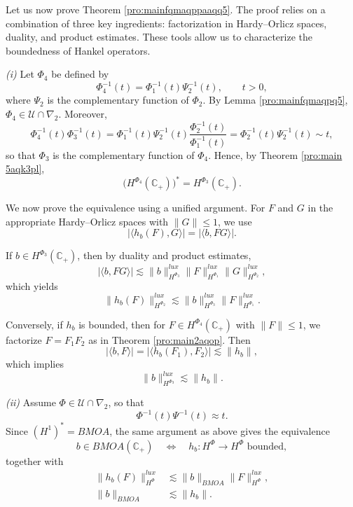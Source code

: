 \documentclass[a4paper,12pt,intlimits,oneside]{amsart}
\theoremstyle{definition}
\numberwithin{equation}{section}
\theoremstyle{definition}
\begin{document}
Let us now prove Theorem \ref{pro:mainfqmaqppaaqq5}.
The proof relies on a combination of three key ingredients: 
factorization in Hardy--Orlicz spaces, duality, and product estimates. 
These tools allow us to characterize the boundedness of Hankel operators.

\medskip

\noindent

\textit{(i)} 
Let $\Phi_{4}$ be defined by
\[
\Phi_{4}^{-1}(t)=\Phi_{1}^{-1}(t)\Psi_{2}^{-1}(t), \qquad t>0,
\]
where $\Psi_{2}$ is the complementary function of $\Phi_{2}$. By Lemma \ref{pro:mainfqmaqpq5}, $\Phi_{4}\in \mathscr{U}\cap\nabla_{2}$. Moreover,
\[
\Phi_{4}^{-1}(t)\Phi_{3}^{-1}(t)
= \Phi_{1}^{-1}(t)\Psi_{2}^{-1}(t)\frac{\Phi_{2}^{-1}(t)}{\Phi_{1}^{-1}(t)}
= \Phi_{2}^{-1}(t)\Psi_{2}^{-1}(t)\sim t,
\]
so that $\Phi_{3}$ is the complementary function of $\Phi_{4}$. Hence, by Theorem \ref{pro:main 5aqk3pl}, 
\[
\big(H^{\Phi_{4}}(\mathbb{C}_{+})\big)^{*}=H^{\Phi_{3}}(\mathbb{C}_{+}).
\]

\smallskip

We now prove the equivalence using a unified argument. For $F$ and $G$ in the appropriate Hardy--Orlicz spaces with $\|G\|\leq 1$, we use
\[
|\langle h_{b}(F),G\rangle|
=|\langle b,FG\rangle|.
\]

If $b\in H^{\Phi_{3}}(\mathbb{C}_{+})$, then by duality and product estimates,
\[
|\langle b,FG\rangle|
\lesssim \|b\|_{H^{\Phi_{3}}}^{lux}
\|F\|_{H^{\Phi_{1}}}^{lux}
\|G\|_{H^{\Psi_{2}}}^{lux},
\]
which yields
\begin{equation}\label{eq:ineitedehay}
\|h_{b}(F)\|_{H^{\Phi_{2}}}^{lux}
\lesssim \|b\|_{H^{\Phi_{3}}}^{lux}
\|F\|_{H^{\Phi_{1}}}^{lux}.
\end{equation}

Conversely, if $h_{b}$ is bounded, then for $F\in H^{\Phi_{4}}(\mathbb{C}_{+})$ with $\|F\|\leq 1$, we factorize $F=F_{1}F_{2}$ as in Theorem \ref{pro:main2aqop}. Then
\[
|\langle b,F\rangle|
=|\langle h_{b}(F_{1}),F_{2}\rangle|
\lesssim \|h_{b}\|,
\]
which implies
\begin{equation}\label{eq:ineitaqedehay}
\|b\|_{H^{\Phi_{3}}}^{lux}\lesssim \|h_{b}\|.
\end{equation}

\medskip

\textit{(ii)} 
Assume $\Phi\in \mathscr{U}\cap\nabla_{2}$, so that
\[
\Phi^{-1}(t)\Psi^{-1}(t)\approx t.
\]
Since $(H^{1})^{*}=BMOA$, the same argument as above gives the equivalence
\[
b\in BMOA(\mathbb{C}_{+})
\quad \Longleftrightarrow \quad
h_{b}:H^{\Phi}\to H^{\Phi} \text{ bounded},
\]
together with
\begin{align}
\|h_{b}(F)\|_{H^{\Phi}}^{lux}
&\lesssim \|b\|_{BMOA}\|F\|_{H^{\Phi}}^{lux}, \label{eq:ineiteday}\\
\|b\|_{BMOA}
&\lesssim \|h_{b}\|. \label{eq:ineitaqedaqehay}
\end{align}
\end{document}
